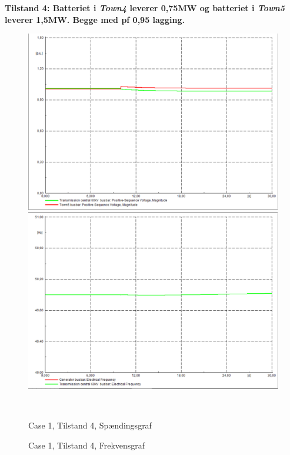 \textbf{Tilstand 4: Batteriet i \textit{Town4} leverer 0,75MW og batteriet i \textit{Town5} leverer 1,5MW. Begge med pf 0,95 lagging.}
\begin{figure}[H]
	\centering
	\begin{minipage}[b]{0.48\textwidth}
		\centering
		\includegraphics[width=1.00\textwidth]{figurer/SmallDisturbance/Voltage4} %
	\end{minipage}
	\hfill
	\begin{minipage}[b]{0.48\textwidth}
		\centering
		\includegraphics[width=1.00\textwidth]{figurer/SmallDisturbance/Freq4} %
	\end{minipage}
	\\ %
	\begin{minipage}[t]{0.48\textwidth}
		\caption{Case 1, Tilstand 4, Spændingsgraf} %
		\label{fig:C1T4V}
	\end{minipage}
	\hfill
	\begin{minipage}[t]{0.48\textwidth}
		\caption{Case 1, Tilstand 4, Frekvensgraf} %
		\label{fig:C1T4F}
	\end{minipage}
\end{figure}

